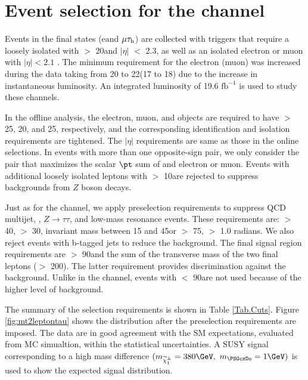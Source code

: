 \section{\texorpdfstring{Event selection for the \leptonTau channel}{Event selection for the lepton-tau channel}}
\label{sect:eleTauCuts}
Events in the \leptonTau final states (e\Tau and $\mu\tau_{\rm h}$)
are collected with triggers that require 
a loosely isolated \Tau with \PT $>$ 20\GeV and $|\eta|$ $<$ 2.3, as well as
an isolated electron or muon with $|\eta| < 2.1$ \cite{Chatrchyan:2011nv,Khachatryan:2015hwa,Chatrchyan:2012xi}.  The minimum
\PT requirement for the electron (muon) was increased during the data taking from 20 to 22\GeV (17 to 18\GeV)
due to the increase in instantaneous luminosity. An integrated luminosity of 19.6 $\mathrm{fb}^{-1}$ is used to study these channels.

In the offline analysis, the electron, muon, and \Tau objects are required to have \PT $>$ 25, 20, and 25\GeV, respectively, 
and the corresponding identification and isolation requirements are tightened. The $|\eta|$ requirements are same as those in the online selections.
In events with more than one opposite-sign \leptonTau pair, we only consider
 the pair that maximizes the scalar $\pt$ sum of \Tau and electron or muon.  Events with additional loosely isolated leptons
with \PT $>$ 10\GeV are rejected to suppress backgrounds from $Z$ boson
decays.  

Just as for the \tauTau channel, we apply preselection requirements to suppress
QCD multijet, \ttbar, $Z \to \tau \tau$, and low-mass resonance events.
These requirements are: \mttwo $>$ 40\GeV, \MPT $>$ 30\GeV, \leptonTau 
invariant mass between 15 and 45\GeV or $>$ 75\GeV, \deltaphi $>$ 1.0 radians. We also reject events with b-tagged jets to reduce the 
\ttbar background.
 The final signal region requirements are \mttwo $>$ 90\GeV and the sum of the transverse mass of the two final leptons
(\tauMT $>$ 200\GeV). %
The latter requirement provides discrimination against the \wjets background.  Unlike in the \tauTau channel,
events with \mttwo $<$ 90\GeV are not used because of the higher 
level of background. 

The summary of the selection requirements is shown in Table \ref{Tab.Cuts}.
Figure \ref{fig:mt2leptontau} %
shows the \mttwo distribution after the preselection requirements are imposed. 
The data are in good agreement with the SM expectations, evaluated from MC simualtion, within the statistical uncertainties. 
A SUSY signal corresponding to a high mass difference 
 $(m_{\chione}=380\GeV,~m_{\PSGczDo}=1\GeV)$ is used to show the expected signal distribution.


